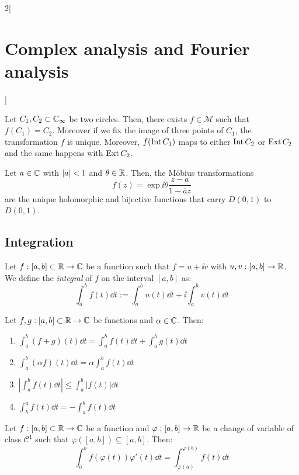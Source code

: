 \documentclass[../../../main.tex]{subfiles}
\begin{document}
\begin{multicols}{2}[\section{Complex analysis and Fourier analysis}]
\begin{proposition}
  \end{proposition}
  \begin{corollary}
    Let $C_1,C_2\subset\mathbb{C}_\infty$ be two circles. Then, there exists $f\in\mathcal{M}$ such that $f(C_1)=C_2$. Moreover if we fix the image of three points of $C_1$, the transformation $f$ is unique. Moreover, $f(\operatorname{Int} C_1)$ maps to either $\operatorname{Int} C_2$ or $\operatorname{Ext} C_2$ and the same happens with $\operatorname{Ext} C_2$.
  \end{corollary}
  \begin{proposition}
    Let $a\in\mathbb{C}$ with $\abs{a}<1$ and $\theta\in\mathbb{R}$. Then, the Möbius transformations
    $$f(z)=\exp{\ii \theta}\frac{z-a}{1-\overline{a}z}$$
    are the unique holomorphic and bijective functions that carry $D(0,1)$ to $D(0,1)$.
  \end{proposition}
  \subsection{Integration}
  \begin{definition}
    Let $f:[a,b]\subset\mathbb{R}\rightarrow\mathbb{C}$ be a function such that $f=u+\ii v$ with $u,v:[a,b]\rightarrow\mathbb{R}$. We define the \emph{integral} of $f$ on the interval $[a,b]$ as: $$\int_a^bf(t)\dd{t}:=\int_a^bu(t)\dd{t}+\ii\int_a^bv(t)\dd{t}$$
  \end{definition}
  \begin{proposition}
    Let $f,g:[a,b]\subset\mathbb{R}\rightarrow\mathbb{C}$ be functions and $\alpha\in\mathbb{C}$. Then:
    \begin{enumerate}
      \item $\displaystyle\int_a^b(f+g)(t)\dd{t}=\int_a^bf(t)\dd{t}+\int_a^bg(t)\dd{t}$
      \item $\displaystyle\int_a^b(\alpha f)(t)\dd{t}=\alpha \int_a^bf(t)\dd{t}$
      \item $\displaystyle\left|\int_a^bf(t)\dd{t}\right|\leq\int_a^b|f(t)|\dd{t}$
      \item $\displaystyle \int_b^af(t)\dd{t}=-\int_a^bf(t)\dd{t}$
    \end{enumerate}
  \end{proposition}
  \begin{proposition}
    Let $f:[a,b]\subset\mathbb{R}\rightarrow\mathbb{C}$ be a function and $\varphi:[a,b]\rightarrow\mathbb{R}$ be a change of variable of class $\mathcal{C}^1$ such that $\varphi([a,b])\subseteq[a,b]$. Then: $$\int_a^bf(\varphi(t))\varphi'(t)\dd{t}=\int_{\varphi(a)}^{\varphi(b)}f(t)\dd{t}$$
  \end{proposition}

\end{multicols}
\end{document}

